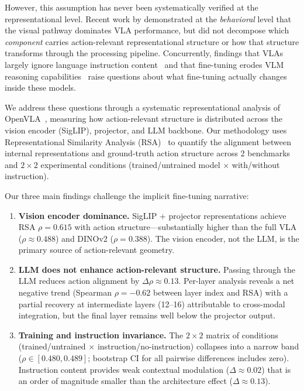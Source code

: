 \documentclass[letterpaper]{article}
\begin{document}
However, this assumption has never been systematically verified at the representational level.
Recent work by \citet{grant2026visual} demonstrated at the \emph{behavioral} level that the visual pathway dominates VLA performance, but did not decompose which \emph{component} carries action-relevant representational structure or how that structure transforms through the processing pipeline.
Concurrently, findings that VLAs largely ignore language instruction content~\citep{hou2026langgap,fei2025liberoplus} and that fine-tuning erodes VLM reasoning capabilities~\citep{fang2025finetuning} raise questions about what fine-tuning actually changes inside these models.

We address these questions through a systematic representational analysis of OpenVLA~\citep{kim2024openvla}, measuring how action-relevant structure is distributed across the vision encoder (SigLIP), projector, and LLM backbone.
Our methodology uses Representational Similarity Analysis (RSA)~\citep{kriegeskorte2008rsa} to quantify the alignment between internal representations and ground-truth action structure across 2 benchmarks and $2 \times 2$ experimental conditions (trained/untrained model $\times$ with/without instruction).

Our three main findings challenge the implicit fine-tuning narrative:

\begin{enumerate}
    \item \textbf{Vision encoder dominance.}
    SigLIP + projector representations achieve RSA $\rho=0.615$ with action structure---substantially higher than the full VLA ($\rho\approx0.488$) and DINOv2 ($\rho=0.388$).
    The vision encoder, not the LLM, is the primary source of action-relevant geometry.

    \item \textbf{LLM does not enhance action-relevant structure.}
    Passing through the LLM reduces action alignment by $\Delta\rho\approx0.13$.
    Per-layer analysis reveals a net negative trend (Spearman $\rho=-0.62$ between layer index and RSA) with a partial recovery at intermediate layers (12--16) attributable to cross-modal integration, but the final layer remains well below the projector output.

    \item \textbf{Training and instruction invariance.}
    The $2 \times 2$ matrix of conditions (trained/untrained $\times$ instruction/no-instruction) collapses into a narrow band ($\rho\in[0.480, 0.489]$; bootstrap CI for all pairwise differences includes zero).
    Instruction content provides weak contextual modulation ($\Delta\approx0.02$) that is an order of magnitude smaller than the architecture effect ($\Delta\approx0.13$).
\end{enumerate}
\end{document}
